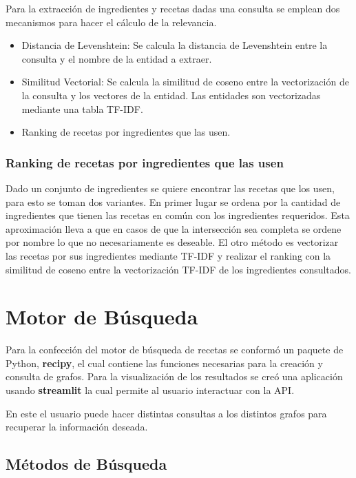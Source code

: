 \documentclass[
	a4paper, %
	10pt, %
	unnumberedsections, %
	twoside, %
]{LTJournalArticle}
\begin{document}
Para la extracción de ingredientes y recetas dadas una consulta se emplean dos mecanismos para hacer el cálculo
de la relevancia.

\begin{itemize}
	\item Distancia de Levenshtein: Se calcula la distancia de Levenshtein entre la consulta y el nombre de la 
	entidad a extraer.
	\item Similitud Vectorial: Se calcula la similitud de coseno entre la vectorización de la consulta y los
	vectores de la entidad. Las entidades son vectorizadas mediante una tabla TF-IDF. 
	\item Ranking de recetas por ingredientes que las usen.
\end{itemize}

\subsubsection{Ranking de recetas por ingredientes que las usen}

Dado un conjunto de ingredientes se quiere encontrar las recetas que los usen, para esto se toman dos variantes.
En primer lugar se ordena por la cantidad de ingredientes que tienen las recetas en común con los ingredientes
requeridos. Esta aproximación lleva a que en casos de que la intersección sea completa se ordene por nombre lo que
no necesariamente es deseable. El otro método es vectorizar las recetas por sus ingredientes mediante TF-IDF y
realizar el ranking con la similitud de coseno entre la vectorización TF-IDF de los ingredientes consultados.

\section{Motor de Búsqueda}

Para la confección del motor de búsqueda de recetas se conformó un paquete de Python, \textbf{recipy}, el cual
contiene las funciones necesarias para la creación y consulta de grafos. Para la visualización de los
resultados se creó una aplicación usando \textbf{streamlit} la cual permite al usuario interactuar con la API.

En este el usuario puede hacer distintas consultas a los distintos grafos para recuperar la información deseada.

\subsection{Métodos de Búsqueda}
\end{document}
